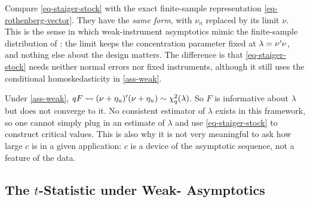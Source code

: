 \documentclass[a4paper,12pt]{article}
\begin{document}
\begin{remark}
	Compare \eqref{eq-staiger-stock} with the exact finite-sample representation \eqref{eq-rothenberg-vector}.
	They have the \emph{same form}, with $\nu_n$ replaced by its limit $\nu$.
	This is the sense in which weak-instrument asymptotics mimic the finite-sample distribution of \textcite{rothenberg-1984}:
	the limit keeps the concentration parameter fixed at $\lambda=\nu^{\prime}\nu$, and nothing else about the design matters.
	The difference is that \eqref{eq-staiger-stock} needs neither normal errors nor fixed instruments,
	although it still uses the conditional homoskedasticity in \autoref{ass-weak}.
\end{remark}


\begin{remark}
	Under \autoref{ass-weak}, $qF\overset{}{\leadsto}(\nu+\eta_u)^{\prime}(\nu+\eta_u)\sim\chi^2_q(\lambda)$.
	So $F$ is informative about $\lambda$ but does not converge to it.
	No consistent estimator of $\lambda$ exists in this framework,
	so one cannot simply plug in an estimate of $\lambda$ and use \eqref{eq-staiger-stock} to construct critical values.
	This is also why it is not very meaningful to ask how large $c$ is in a given application:
	$c$ is a device of the asymptotic sequence, not a feature of the data.
\end{remark}

\subsection{The \texorpdfstring{$t$}{t}-Statistic under Weak- Asymptotics}
\end{document}
